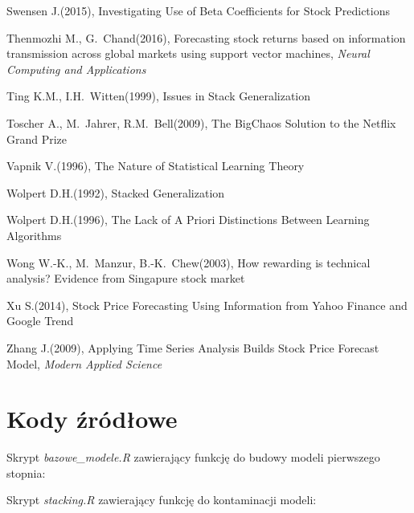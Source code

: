 \documentclass[12pt,a4paper,twoside,openany]{book}
\begin{document}
\begin{thebibliography}{99}
 Swensen J.(2015), Investigating Use of Beta Coefficients for Stock Predictions

 Thenmozhi M., G.~Chand(2016), Forecasting stock returns based on information transmission across global markets using support vector machines, \textit{Neural Computing and Applications}

 Ting K.M., I.H.~Witten(1999), Issues in Stack Generalization

 Toscher A., M.~Jahrer, R.M.~Bell(2009), The BigChaos Solution to the Netflix Grand Prize

 Vapnik V.(1996), The Nature of Statistical Learning Theory

 Wolpert D.H.(1992), Stacked Generalization

 Wolpert D.H.(1996), The Lack of A Priori Distinctions Between Learning Algorithms

 Wong W.-K., M.~Manzur, B.-K.~Chew(2003), How rewarding is technical analysis? Evidence from Singapure stock market

 Xu S.(2014), Stock Price Forecasting Using Information from Yahoo Finance and Google Trend

 Zhang J.(2009), Applying Time Series Analysis Builds Stock Price Forecast Model, \textit{Modern Applied Science}

\end{thebibliography}

\clearpage
{}
\listoffigures

\clearpage
\listoftables
{}

\appendix
\chapter*{Kody źródłowe}

Skrypt \textit{bazowe\_modele.R} zawierający funkcję do budowy modeli pierwszego stopnia:


Skrypt \textit{stacking.R} zawierający funkcję do kontaminacji modeli:

\end{document}
